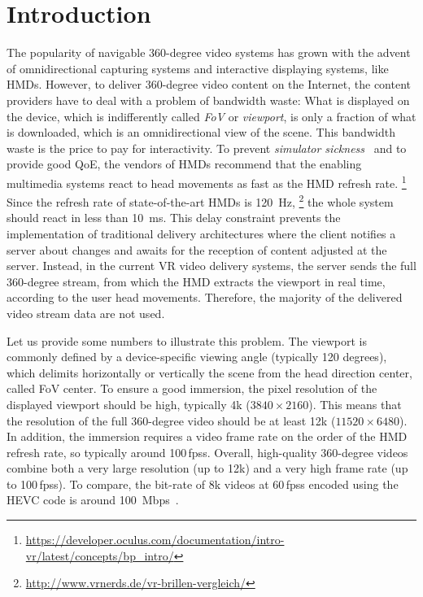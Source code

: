 \section{Introduction}
\label{sec:introduction}


The popularity of navigable 360-degree video systems
has grown with the advent of omnidirectional capturing systems
and interactive displaying
systems, like \acp{HMD}.
However, to deliver 360-degree video content on the Internet, the content providers
have to deal with a problem of bandwidth waste: What is displayed on the device,
which is indifferently called \textit{\ac{FoV}} or \textit{viewport}, is only a fraction of what is downloaded, which is an omnidirectional view of the scene.
This bandwidth waste is the price to pay for interactivity.
To prevent \emph{simulator sickness}~\cite{moss2011characteristics}
and to provide good \ac{QoE}, the vendors of \acp{HMD} recommend that the enabling multimedia
systems react
to head movements as fast as the \ac{HMD}
refresh rate.%
\footnote{\url{https://developer.oculus.com/documentation/intro-vr/latest/concepts/bp_intro/}}
Since the refresh rate of
state-of-the-art \acp{HMD} is \SI{120}{Hz},%
\footnote{\url{http://www.vrnerds.de/vr-brillen-vergleich/}}
the whole system should react in less than
\SI{10}{ms}. This delay constraint prevents the implementation of traditional delivery
architectures where the client notifies a server about changes and awaits for the reception
of content adjusted at the server. Instead, in the current \ac{VR} video delivery systems, the server sends the
full 360-degree stream, from which the \ac{HMD}
extracts the viewport in real time, according to the user head movements. Therefore, the majority of the delivered video stream data are not used.

Let us provide some numbers to illustrate this problem.
The viewport is commonly defined by
a device-specific viewing angle (typically 120 degrees), which delimits horizontally or
vertically the scene from the head direction center, called \ac{FoV} center. To ensure a good
immersion, the pixel
resolution of
the displayed viewport should be high, typically 4k ($3840\times2160$). This means that
the resolution of the full 360-degree video should be at least 12k ($11520\times6480$).
In addition, the immersion requires a video frame rate on the order of the HMD refresh rate, so
typically around 100\,\acp{fps}.
Overall, high-quality 360-degree videos combine both a very large resolution (up to 12k)
and a very high frame rate (up to 100\,\acp{fps}). To compare, the bit-rate of 8k videos
at 60\,\acp{fps} encoded using the \ac{HEVC} code is around \SI{100}{Mbps}~\cite{7398367}.


